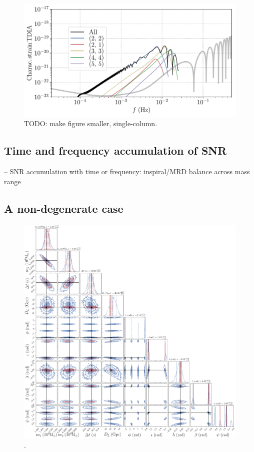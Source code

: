 \documentclass[aps,showpacs,twocolumn,prd,superscriptaddress,nofootinbib]{revtex4-1}
\newcommand{\SM}[1]{{\color{Blue} #1}}
\begin{document}
\begin{figure}
  \centering
  \includegraphics[width=.7\linewidth]{../plots/plot_tdia_hm.pdf}
  \caption{\SM{TODO: make figure smaller, single-column.}}
  \label{fig:FDHMSMBHCase9}
\end{figure}


\subsection{Time and frequency accumulation of SNR}
\label{sec:timefreqSNR}

-- SNR accumulation with time or frequency: inspiral/MRD balance across mass range


\subsection{A non-degenerate case}
\label{sec:SMBHPEnondeg}

\begin{figure}
  \centering
  \includegraphics[width=.98\linewidth]{../plots/corner_smbh_case0_ptmcmc_22_hm.png}
  \caption{.}
  \label{fig:PEsmbh22hmCase0}
\end{figure}
\end{document}

